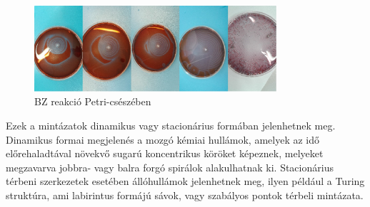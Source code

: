 \begin{figure}[h]
\centering
\includegraphics[width=0.8\textwidth]{img/oscillating_reaction.jpg}
\caption{BZ reakció Petri-csészében}
\label{fig:ionophores}
\end{figure}

Ezek a mintázatok dinamikus vagy stacionárius formában jelenhetnek meg.
Dinamikus formai megjelenés a mozgó kémiai hullámok, amelyek az idő előrehaladtával növekvő sugarú koncentrikus köröket képeznek, melyeket megzavarva jobbra- vagy balra forgó spirálok alakulhatnak ki.
Stacionárius térbeni szerkezetek esetében állóhullámok jelenhetnek meg, ilyen például a Turing struktúra, ami labirintus formájú sávok, vagy szabályos pontok térbeli mintázata.

